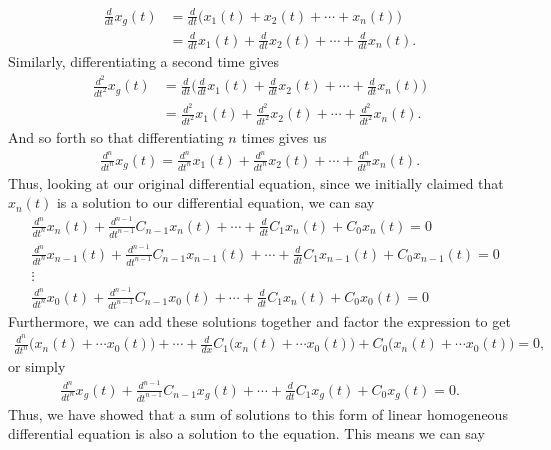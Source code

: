 \begin{align}
\frac{d}{dt}x_g(t) &=\frac{d}{dt}\big(x_1(t)+x_2(t)+\cdots+x_n(t) \big) \\
&=\frac{d}{dt}x_1(t)+\frac{d}{dt}x_2(t)+\cdots+\frac{d}{dt}x_n(t).
\end{align}
Similarly, differentiating a second time gives
\begin{align}
\frac{d^2}{dt^2}x_g(t) &= \frac{d}{dt}\bigg(\frac{d}{dt}x_1(t)+\frac{d}{dt}x_2(t)+\cdots+\frac{d}{dt}x_n(t)\bigg) \\
&=\frac{d^2}{dt^2}x_1(t)+\frac{d^2}{dt^2}x_2(t)+\cdots+\frac{d^2}{dt^2}x_n(t).
\end{align}
And so forth so that differentiating $n$ times gives us
\begin{align}
\frac{d^n}{dt^n}x_g(t)=\frac{d^n}{dt^n}x_1(t)+\frac{d^n}{dt^n}x_2(t)+\cdots+\frac{d^n}{dt^n}x_n(t).
\end{align}
Thus, looking at our original differential equation, since we initially claimed that $x_n(t)$ is a solution to our differential equation, we can say
\begin{align}
&\frac{d^n}{dt^n}x_n(t)+\frac{d^{n-1}}{dt^{n-1}}C_{n-1}x_n(t)+\cdots+\frac{d}{dt}C_1x_n(t)+C_0x_n(t)=0 \\
&\frac{d^n}{dt^n}x_{n-1}(t)+\frac{d^{n-1}}{dt^{n-1}}C_{n-1}x_{n-1
}(t)+\cdots+\frac{d}{dt}C_1x_{n-1}(t)+C_0x_{n-1}(t)=0 \\
& \vdots \nonumber \\
&\frac{d^n}{dt^n}x_0(t)+\frac{d^{n-1}}{dt^{n-1}}C_{n-1}x_0(t)+\cdots+\frac{d}{dt}C_1x_n(t)+C_0x_0(t)=0
\end{align}
Furthermore, we can add these solutions together and factor the expression to get
\begin{align}
\frac{d^n}{dt^n}\big(x_n(t)+\cdots x_0(t)\big)+\cdots+\frac{d}{dx}C_1\big(x_n(t)+\cdots x_0(t)\big)+C_0\big(x_n(t)+\cdots x_0(t)\big)=0,
\end{align}
or simply
\begin{align}
\frac{d^n}{dt^n}x_g(t)+\frac{d^{n-1}}{dt^{n-1}}C_{n-1}x_g(t)+\cdots+\frac{d}{dt}C_1x_g(t)+C_0x_g(t)=0.
\end{align}
Thus, we have showed that a sum of solutions to this form of linear homogeneous differential equation is also a solution to the equation. This means we can say









